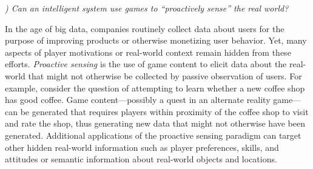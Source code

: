 \documentclass[conference]{IEEEtran}
\newcounter{questionno}
\newcommand{\mytodo}[1]{\textbf{[[#1]]}}
\newcommand{\subsubsectionx}[1]{{\em {\arabic{questionno}) #1}}
	\addtocounter{questionno}{1}
	}
\begin{document}


\subsubsectionx{Can an intelligent system use games to ``proactively sense'' the real world?}
%
In the age of big data, companies routinely collect data about users for the purpose of improving products or otherwise monetizing user behavior. 
Yet, many aspects of player motivations or real-world context remain hidden from these efforts. 
{\em Proactive sensing} is the use of game content to elicit data about the real-world that might not otherwise be collected by passive observation of users.
%
For example, consider the question of attempting to learn whether a new coffee shop has good coffee.
Game content---possibly a quest in an alternate reality game---can be generated that requires players within proximity of the coffee shop to visit and rate the shop, thus generating new data that might not otherwise have been generated.
Additional applications of the proactive sensing paradigm can target other hidden real-world information such as player preferences, skills, and attitudes or semantic information about real-world objects and locations.
\end{document}
